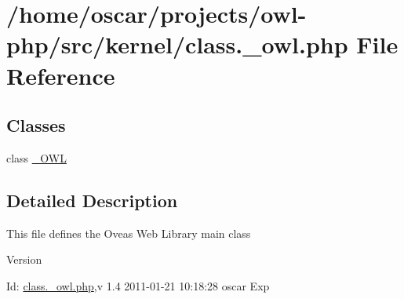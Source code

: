 \section{/home/oscar/projects/owl-\/php/src/kernel/class.\_\-owl.php File Reference}
\label{class_8__owl_8php}
\subsection*{Classes}
\begin{DoxyCompactItemize}
\item 
class \hyperlink{class__OWL}{\_\-OWL}
\end{DoxyCompactItemize}


\subsection{Detailed Description}
This file defines the Oveas Web Library main class \begin{DoxyVersion}{Version}

\end{DoxyVersion}
\begin{DoxyParagraph}{Id:}
\hyperlink{class_8__owl_8php}{class.\_\-owl.php},v 1.4 2011-\/01-\/21 10:18:28 oscar Exp 
\end{DoxyParagraph}
